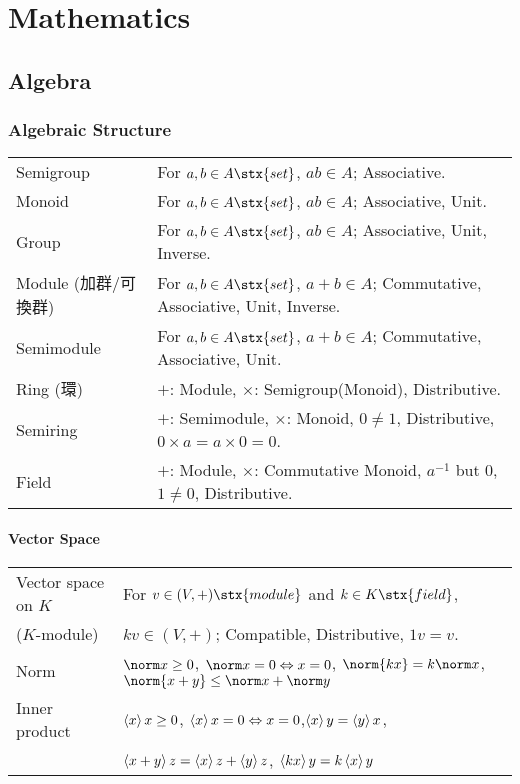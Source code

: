 
\newcommand{\Hom}{\mathop{\mathrm{Hom}}}
\section{Mathematics}
\subsection{Algebra}
\subsubsection{Algebraic Structure}
\begin{tabular}{l@{ :\ \ \ }l}
Semigroup     & For $a,b\in A\stx{set}$, $ab\in A$; Associative.\\
Monoid        & For $a,b\in A\stx{set}$, $ab\in A$; Associative, Unit.\\
Group         & For $a,b\in A\stx{set}$, $ab\in A$; Associative, Unit, Inverse.\\
Module {\tiny (加群/可換群)}
              & For $a,b\in A\stx{set}$, $a+b\in A$; Commutative, Associative, Unit, Inverse.\\
Semimodule    & For $a,b\in A\stx{set}$, $a+b\in A$; Commutative, Associative, Unit.\\
Ring   {\tiny (環)}
              & $+$: Module, $\times$: Semigroup{\footnotesize (Monoid)}, Distributive.\\
Semiring      & $+$: Semimodule, $\times$: Monoid, $0\neq1$, Distributive, $0\times a = a\times 0 = 0$.\\
Field         & $+$: Module, $\times$: Commutative Monoid, $a^{-1}$ but $0$, $1\neq0$, Distributive.
\end{tabular}

\vspace{.5zw}

\paragraph{Vector Space}
\begin{tabular}{l@{ :\ \ \ }l}
Vector space on $K$  & For $v\in(V,+)\stx{module}$ and $k\in K\stx{field}$,\\
\hfill ($K$-module)  & \qquad $k v\in (V,+)$; Compatible, Distributive, $1v=v$.\\
Norm &
    $\norm x\ge0$, $\norm x=0\Leftrightarrow x=0$, $\norm{kx}=k\norm x$,
    $\norm{x+y}\le \norm x+\norm y$\\
Inner product & $\braket xx\ge0$, $\braket xx=0\Leftrightarrow x=0$,$\braket{x}{y}=\braket{y}{x}$,\\
              & \qquad $\braket{x+y}z=\braket xz + \braket yz$, $\braket{kx}y =k\braket xy$

\end{tabular}

